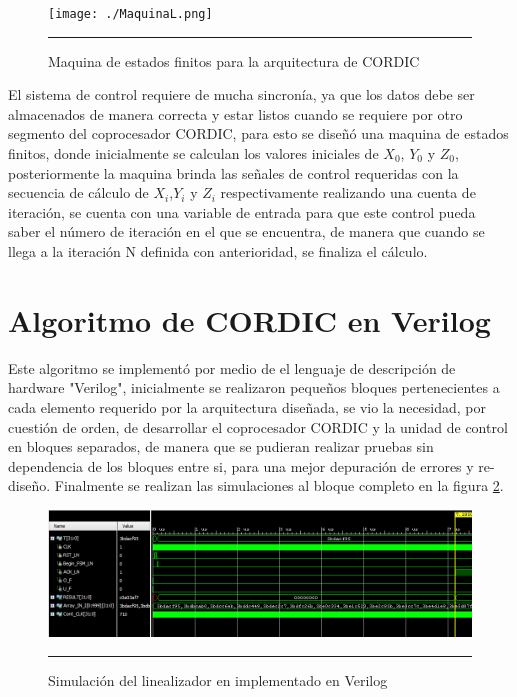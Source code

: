 \begin{figure}[H]
  \centering
    \texttt{[image: ./MaquinaL.png]}
    \rule{35em}{0.5pt}
  \caption[Maquina de estados finitos para la arquitectura de CORDIC]{Maquina de estados finitos para la arquitectura de CORDIC   }
  \label{fig:FSML}
\end{figure}

El sistema de control requiere de mucha sincronía, ya que los datos debe ser almacenados de manera correcta y estar listos cuando se requiere por otro segmento del coprocesador CORDIC, para esto se diseñó una maquina de estados finitos, donde inicialmente se calculan los valores iniciales de $ X_0 $, $ Y_0 $ y $ Z_0 $, posteriormente la maquina brinda las señales de control requeridas con la secuencia de cálculo de $ X_i $,$ Y_i $ y $ Z_i $ respectivamente realizando una cuenta de iteración, se cuenta con una variable de entrada para que este control pueda saber el número de iteración en el que se encuentra, de manera que cuando se llega a la iteración N definida con anterioridad, se finaliza el cálculo.

\section{Algoritmo de CORDIC en Verilog}

Este algoritmo se implementó por medio de el lenguaje de descripción de hardware "Verilog", inicialmente se realizaron pequeños bloques pertenecientes a cada elemento requerido por la arquitectura diseñada, se vio la necesidad, por cuestión de orden, de desarrollar el coprocesador CORDIC y la unidad de control en bloques separados, de manera que se pudieran realizar pruebas sin dependencia de los bloques entre si, para una mejor depuración de errores y re-diseño. Finalmente se realizan las simulaciones al bloque completo en la figura \ref{fig:SIMLINEAL}. 

\begin{figure}[H]
  \centering
    \includegraphics[scale=0.6]{./TEST_LINEALIZADOR_I.png}
    \rule{35em}{0.5pt}
  \caption[Simulación del linealizador en implementado en Verilog]{Simulación del linealizador en implementado en Verilog}
  \label{fig:SIMLINEAL}
\end{figure}   

